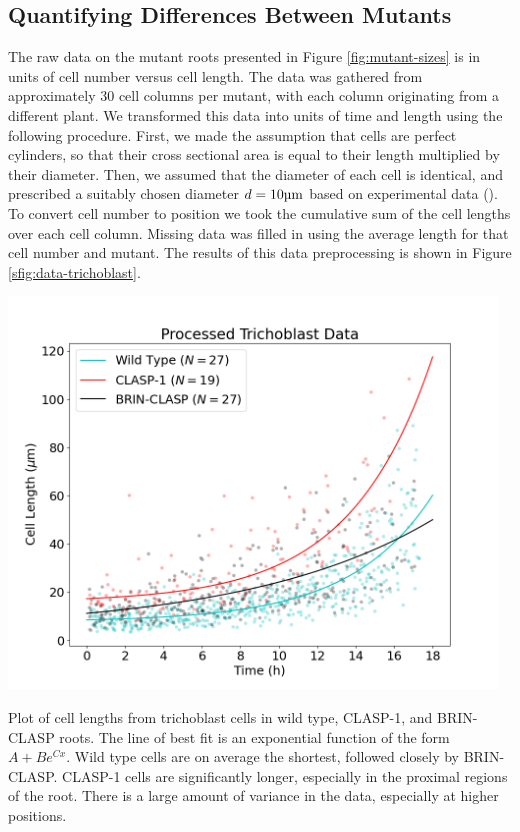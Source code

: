 \subsection{Quantifying Differences Between Mutants}

The raw data on the mutant roots presented in Figure \ref{fig:mutant-sizes} is in units of cell number versus cell length. The data was gathered from approximately $30$ cell columns per mutant, with each column originating from a different plant. We transformed this data into units of time and length using the following procedure. First, we made the assumption that cells are perfect cylinders, so that their cross sectional area is equal to their length multiplied by their diameter. Then, we assumed that the diameter of each cell is identical, and prescribed a suitably chosen diameter $d = 10\um$ based on experimental data (\cite{goh2023}). To convert cell number to position we took the cumulative sum of the cell lengths over each cell column. Missing data was filled in using the average length for that cell number and mutant. The results of this data preprocessing is shown in Figure \ref{sfig:data-trichoblast}.

\begin{supplementaryfigure}
    \centering
    \includegraphics[width=13cm]{img/data-trichoblast.png}
    \caption{Plot of cell lengths from trichoblast cells in wild type, CLASP-1, and BRIN-CLASP roots. The line of best fit is an exponential function of the form $A + Be^{Cx}$. Wild type cells are on average the shortest, followed closely by BRIN-CLASP. CLASP-1 cells are significantly longer, especially in the proximal regions of the root. There is a large amount of variance in the data, especially at higher positions.}
    \label{sfig:data-trichoblast}
\end{supplementaryfigure}

